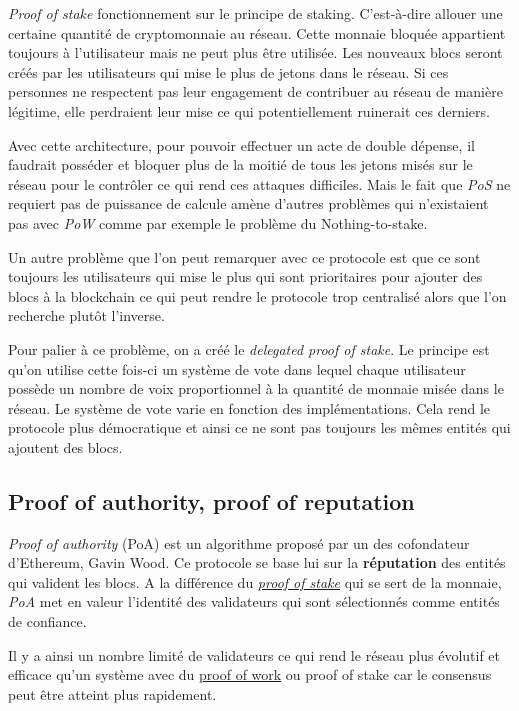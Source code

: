 \textit{Proof of stake} fonctionnement sur le principe de staking. C'est-à-dire allouer une certaine quantité de cryptomonnaie au réseau. Cette monnaie bloquée appartient toujours à l'utilisateur mais ne peut plus être utilisée. Les nouveaux blocs seront créés par les utilisateurs qui mise le plus de jetons dans le réseau. Si ces personnes ne respectent pas leur engagement de contribuer au réseau de manière légitime, elle perdraient leur mise ce qui potentiellement ruinerait ces derniers. 

Avec cette architecture, pour pouvoir effectuer un acte de double dépense, il faudrait posséder et bloquer plus de la moitié de tous les jetons misés sur le réseau pour le contrôler ce qui rend ces attaques difficiles. Mais le fait que \textit{PoS} ne requiert pas de puissance de calcule amène d'autres problèmes qui n'existaient pas avec \textit{PoW} comme par exemple le problème du Nothing-to-stake.

Un autre problème que l'on peut remarquer avec ce protocole est que ce sont toujours les utilisateurs qui mise le plus qui sont prioritaires pour ajouter des blocs à la blockchain ce qui peut rendre le protocole trop centralisé alors que l'on recherche plutôt l'inverse.

Pour palier à ce problème, on a créé le \textit{delegated proof of stake}. Le principe est qu'on utilise cette fois-ci un système de vote dans lequel chaque utilisateur possède un nombre de voix proportionnel à la quantité de monnaie misée dans le réseau. Le système de vote varie en fonction des implémentations. Cela rend le protocole plus démocratique et ainsi ce ne sont pas toujours les mêmes entités qui ajoutent des blocs.

\subsection{Proof of authority, proof of reputation}
\label{consensus:poa}

\emph{Proof of authority} (PoA) est un algorithme proposé par un des cofondateur d'Ethereum, Gavin Wood. Ce protocole se base lui sur la \textbf{réputation} des entités qui valident les blocs. A la différence du \hyperref[consensus:pos]{\emph{proof of stake}} qui se sert de la monnaie, \emph{PoA} met en valeur l'identité des validateurs qui sont sélectionnés comme entités de confiance.

Il y a ainsi un nombre limité de validateurs ce qui rend le réseau plus évolutif et efficace qu'un système avec du \hyperref[consensus:pow]{proof of work} ou proof of stake car le consensus peut être atteint plus rapidement.

